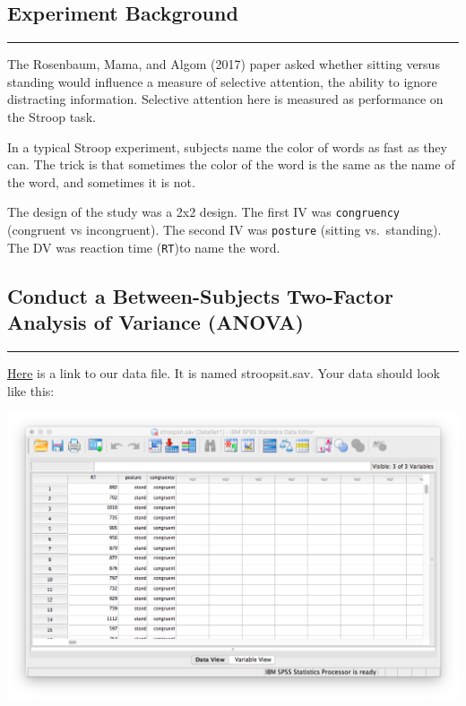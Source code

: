\documentclass[
]{book}
\begin{document}
\hypertarget{experiment-background-8}{%
\subsection{Experiment Background}\label{experiment-background-8}}

\begin{center}\rule{0.5\linewidth}{0.5pt}\end{center}

The Rosenbaum, Mama, and Algom (2017) paper asked whether sitting versus standing would influence a measure of selective attention, the ability to ignore distracting information. Selective attention here is measured as performance on the Stroop task.

In a typical Stroop experiment, subjects name the color of words as fast as they can. The trick is that sometimes the color of the word is the same as the name of the word, and sometimes it is not.

The design of the study was a 2x2 design. The first IV was \texttt{congruency} (congruent vs incongruent). The second IV was \texttt{posture} (sitting vs.~standing). The DV was reaction time (\texttt{RT})to name the word.

\hypertarget{conduct-a-between-subjects-two-factor-analysis-of-variance-anova}{%
\subsection{Conduct a Between-Subjects Two-Factor Analysis of Variance (ANOVA)}\label{conduct-a-between-subjects-two-factor-analysis-of-variance-anova}}

\begin{center}\rule{0.5\linewidth}{0.5pt}\end{center}

\href{https://github.com/CrumpLab/statisticsLab/blob/master/data/spssdata/stroopsit.sav}{Here} is a link to our data file. It is named stroopsit.sav. Your data should look like this:

\includegraphics{img/10.4.11.png}
\end{document}
